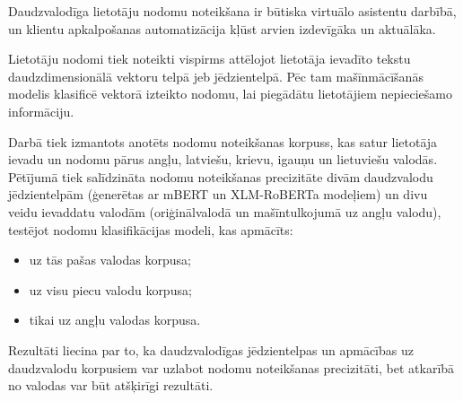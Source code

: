 Daudzvalodīga lietotāju nodomu noteikšana ir būtiska virtuālo asistentu darbībā, un klientu apkalpošanas automatizācija kļūst arvien izdevīgāka un aktuālāka. 

Lietotāju nodomi tiek noteikti vispirms attēlojot lietotāja ievadīto tekstu daudzdimensionālā vektoru telpā jeb jēdzientelpā. Pēc tam mašīnmācīšanās modelis klasificē vektorā izteikto nodomu, lai piegādātu lietotājiem nepieciešamo informāciju.

Darbā tiek izmantots anotēts nodomu noteikšanas korpuss, kas satur lietotāja ievadu un nodomu pārus angļu, latviešu, krievu, igauņu un lietuviešu valodās. Pētījumā tiek salīdzināta nodomu noteikšanas precizitāte divām daudzvalodu jēdzientelpām (ģenerētas ar mBERT un XLM-RoBERTa modeļiem) un divu veidu ievaddatu valodām (oriģinālvalodā un mašīntulkojumā uz angļu valodu), testējot nodomu klasifikācijas modeli, kas apmācīts:
\begin{itemize}
    \item uz tās pašas valodas korpusa;
    \item uz visu piecu valodu korpusa;
    \item tikai uz angļu valodas korpusa.
\end{itemize}

Rezultāti liecina par to, ka daudzvalodīgas jēdzientelpas un apmācības uz daudzvalodu korpusiem var uzlabot nodomu noteikšanas precizitāti, bet atkarībā no valodas var būt atšķirīgi rezultāti.

